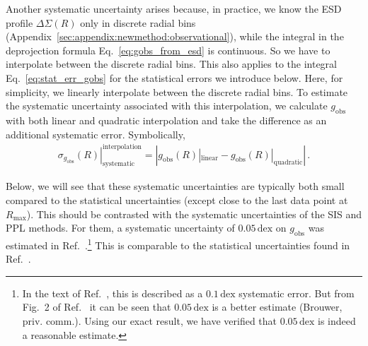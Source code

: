 \documentclass[a4paper,11pt]{article}
\newcommand{\gobs}{\ensuremath{g_{\mathrm{obs}}}}
\begin{document}
Another systematic uncertainty arises because, in practice, we know the ESD profile $\Delta \Sigma(R)$ only in discrete radial bins (Appendix~\ref{sec:appendix:newmethod:observational}), while the integral in the deprojection formula Eq.~\eqref{eq:gobs_from_esd} is continuous.
So we have to interpolate between the discrete radial bins.
This also applies to the integral Eq.~\eqref{eq:stat_err_gobs} for the statistical errors we introduce below.
Here, for simplicity, we linearly interpolate between the discrete radial bins.
To estimate the systematic uncertainty associated with this interpolation, we calculate $\gobs$ with both linear and quadratic interpolation and take the difference as an additional systematic error.
Symbolically,
\begin{align}
 \label{eq:syst_err_gobs_interpolate}
 \left.\sigma_{g_{\mathrm{obs}}}(R)\right|_{\mathrm{systematic}}^{\mathrm{interpolation}} = \left| g_{\mathrm{obs}}(R)|_{\mathrm{linear}} - g_{\mathrm{obs}}(R)|_{\mathrm{quadratic}} \right| \,.
\end{align}

Below, we will see that these systematic uncertainties are typically both small compared to the statistical uncertainties (except close to the last data point at $R_{\mathrm{max}}$).
This should be contrasted with the systematic uncertainties of the SIS and PPL methods.
For them, a systematic uncertainty of $0.05\,\mathrm{dex}$ on $g_{\mathrm{obs}}$ was estimated in Ref.~\cite{Brouwer2021}.\footnote{
  In the text of Ref.~\cite{Brouwer2021}, this is described as a $0.1\,\mathrm{dex}$ systematic error.
  But from Fig.~2 of Ref.~\cite{Brouwer2021} it can be seen that $0.05\,\mathrm{dex}$ is a better estimate (Brouwer, priv. comm.).
  Using our exact result, we have verified that $0.05\,\mathrm{dex}$ is indeed a reasonable estimate.
}
This is comparable to the statistical uncertainties found in Ref.~\cite{Brouwer2021}.
\end{document}
